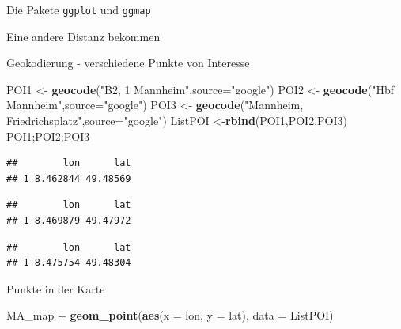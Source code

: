 \documentclass[ignorenonframetext,]{beamer}
\newenvironment{Shaded}{}{}
\newcommand{\KeywordTok}[1]{\textcolor[rgb]{0.00,0.44,0.13}{\textbf{{#1}}}}
\newcommand{\DataTypeTok}[1]{\textcolor[rgb]{0.56,0.13,0.00}{{#1}}}
\newcommand{\StringTok}[1]{\textcolor[rgb]{0.25,0.44,0.63}{{#1}}}
\newcommand{\NormalTok}[1]{{#1}}
\begin{document}
\begin{frame}[fragile]{Die Pakete \texttt{ggplot} und \texttt{ggmap}}
\begin{block}{Eine andere Distanz bekommen}
\end{block}

\begin{block}{Geokodierung - verschiedene Punkte von Interesse}

\begin{Shaded}
\begin{Highlighting}[]
\NormalTok{POI1 <-}\StringTok{ }\KeywordTok{geocode}\NormalTok{(}\StringTok{"B2, 1 Mannheim"}\NormalTok{,}\DataTypeTok{source=}\StringTok{"google"}\NormalTok{)}
\NormalTok{POI2 <-}\StringTok{ }\KeywordTok{geocode}\NormalTok{(}\StringTok{"Hbf Mannheim"}\NormalTok{,}\DataTypeTok{source=}\StringTok{"google"}\NormalTok{)}
\NormalTok{POI3 <-}\StringTok{ }\KeywordTok{geocode}\NormalTok{(}\StringTok{"Mannheim, Friedrichsplatz"}\NormalTok{,}\DataTypeTok{source=}\StringTok{"google"}\NormalTok{)}
\NormalTok{ListPOI <-}\KeywordTok{rbind}\NormalTok{(POI1,POI2,POI3)}
\NormalTok{POI1;POI2;POI3}
\end{Highlighting}
\end{Shaded}

\begin{verbatim}
##        lon      lat
## 1 8.462844 49.48569
\end{verbatim}

\begin{verbatim}
##        lon      lat
## 1 8.469879 49.47972
\end{verbatim}

\begin{verbatim}
##        lon      lat
## 1 8.475754 49.48304
\end{verbatim}

\end{block}

\begin{block}{Punkte in der Karte}

\begin{Shaded}
\begin{Highlighting}[]
\NormalTok{MA_map +}
\KeywordTok{geom_point}\NormalTok{(}\KeywordTok{aes}\NormalTok{(}\DataTypeTok{x =} \NormalTok{lon, }\DataTypeTok{y =} \NormalTok{lat),}
\DataTypeTok{data =} \NormalTok{ListPOI)}
\end{Highlighting}
\end{Shaded}


\end{block}
\end{frame}
\end{document}
